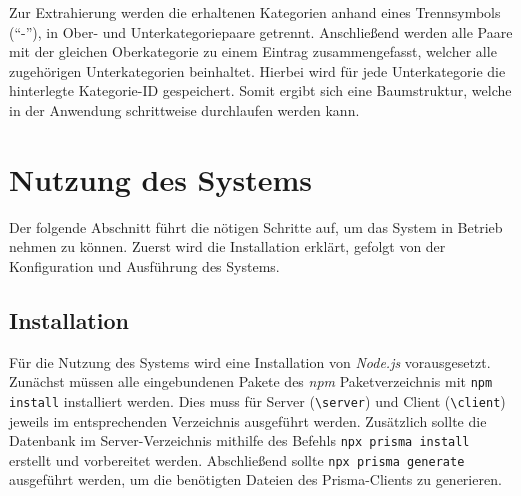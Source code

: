 Zur Extrahierung werden die erhaltenen Kategorien anhand eines Trennsymbols (\enquote{-}), in Ober- und
Unterkategoriepaare getrennt. Anschließend werden alle Paare mit der gleichen Oberkategorie zu einem
Eintrag zusammengefasst, welcher alle zugehörigen Unterkategorien beinhaltet. Hierbei wird für jede
Unterkategorie die hinterlegte Kategorie-ID gespeichert. Somit ergibt sich eine Baumstruktur, welche
in der Anwendung schrittweise durchlaufen werden kann.


\section{Nutzung des Systems}
\label{subsec:nutzung}
Der folgende Abschnitt führt die nötigen Schritte auf, um das System in Betrieb nehmen zu können.
Zuerst wird die Installation erklärt, gefolgt von der Konfiguration und Ausführung des Systems.

\subsection{Installation}
Für die Nutzung des Systems wird eine Installation von \textit{Node.js} vorausgesetzt. Zunächst
müssen alle eingebundenen Pakete des \textit{npm} Paketverzeichnis mit \lstinline{npm install}
installiert werden. Dies muss für Server (\lstinline{\server}) und Client (\lstinline{\client})
jeweils im entsprechenden Verzeichnis ausgeführt werden. Zusätzlich sollte die Datenbank im
Server-Verzeichnis mithilfe des Befehls \lstinline{npx prisma install }
erstellt und vorbereitet werden. Abschließend sollte \lstinline{npx prisma generate} ausgeführt
werden, um die benötigten Dateien des Prisma-Clients zu generieren.

